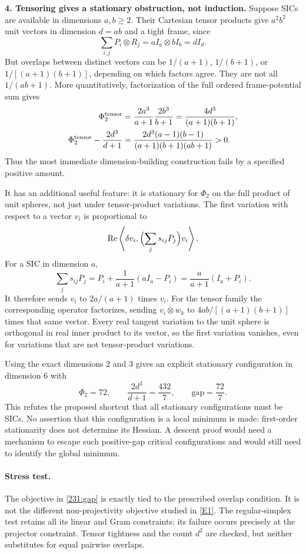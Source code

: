 \documentclass[11pt,a4paper]{article}
\newcommand{\eref}[2]{\hyperlink{extra:#1:#2}{[E#2]}}
\numberwithin{equation}{section}
\begin{document}
\textbf{4. Tensoring gives a stationary obstruction, not induction.}
Suppose SICs are available in dimensions $a,b\geq2$. Their Cartesian
tensor products give $a^2b^2$ unit vectors in dimension $d=ab$ and a
tight frame, since
\[
 \sum_{i,j}P_i\otimes R_j=aI_a\otimes bI_b=dI_d.
\]
But overlaps between distinct vectors can be $1/(a+1)$, $1/(b+1)$,
or $1/[(a+1)(b+1)]$, depending on which factors agree. They are not all
$1/(ab+1)$. More quantitatively, factorization of the full ordered
frame-potential sum gives
\begin{align}
 \Phi_2^{\rm tensor}
    &=\frac{2a^3}{a+1}\frac{2b^3}{b+1}
      =\frac{4d^3}{(a+1)(b+1)},\notag\\
 \Phi_2^{\rm tensor}-\frac{2d^3}{d+1}
    &=\frac{2d^3(a-1)(b-1)}{(a+1)(b+1)(ab+1)}>0.
       \label{231:tensorgap}
\end{align}
Thus the most immediate dimension-building construction fails by a
specified positive amount.

It has an additional useful feature: it is stationary for $\Phi_2$ on
the full product of unit spheres, not just under tensor-product variations.
The first variation with respect to a vector $v_i$ is proportional to
\[
 \operatorname{Re}\left\langle\delta v_i,
             \Bigl(\sum_j s_{ij}P_j\Bigr)v_i\right\rangle.
\]
For a SIC in dimension $a$,
\[
 \sum_j s_{ij}P_j
 =P_i+\frac1{a+1}(aI_a-P_i)
 =\frac{a}{a+1}(I_a+P_i).
\]
It therefore sends $v_i$ to $2a/(a+1)$ times $v_i$. For the tensor
family the corresponding operator factorizes, sending $v_i\otimes w_k$
to
$4ab/[(a+1)(b+1)]$ times that same vector. Every real tangent variation
to the unit sphere is orthogonal in real inner product to its vector,
so the first variation vanishes, even for variations that are not
tensor-product variations.

Using the exact dimensions $2$ and $3$ gives an explicit stationary
configuration in dimension $6$ with
\begin{equation}\label{231:six}
 \Phi_2=72,\qquad \frac{2d^3}{d+1}=\frac{432}{7},\qquad
 \text{gap}=\frac{72}{7}.
\end{equation}
This refutes the proposed shortcut that all stationary configurations
must be SICs. No assertion that this configuration is a local minimum
is made: first-order stationarity does not determine its Hessian.
A descent proof would need a mechanism to escape such positive-gap
critical configurations and would still need to identify the global
minimum.

\paragraph{Stress test.}
The objective in \eqref{231:gap} is exactly tied to the prescribed
overlap condition. It is not the different non-projectivity objective
studied in \eref{231}{1}. The regular-simplex test retains all its
linear and Gram constraints; its failure occurs precisely at the
projector constraint. Tensor tightness and the count $d^2$ are checked,
but neither substitutes for equal pairwise overlaps.
\end{document}
